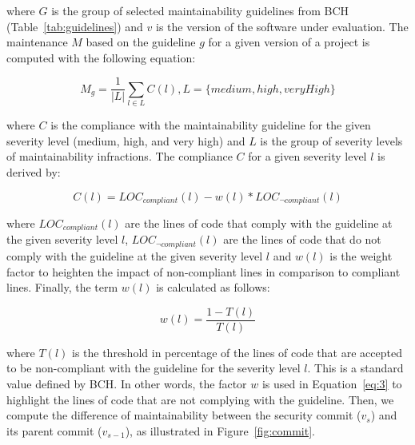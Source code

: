 \documentclass[10pt,conference]{IEEEtran}
\begin{document}
\noindent
where $G$ is the group of selected maintainability guidelines from BCH
(Table~\ref{tab:guidelines}) and $v$ is the version of the software under
evaluation. The maintenance $M$ based on the guideline $g$ for a given version
of a project is computed with the following equation:

\begin{equation}
    M_{g} = \frac{1}{|L|} \sum_{l \in L}^{} C(l) , L = \{medium, high, veryHigh\}
\end{equation}

\noindent
where $C$ is the compliance with the maintainability guideline for the given
severity level (medium, high, and very high) and $L$ is the group of severity
levels of maintainability infractions. The compliance $C$ for a given severity
level $l$ is derived by:

\begin{equation}\label{eq:3}
    C(l) = LOC_{compliant}(l) - w(l) * LOC_{\neg compliant}(l)
\end{equation}

\noindent
where $LOC_{compliant}(l)$ are the lines of code that comply with the guideline
at the given severity level $l$, $LOC_{\neg compliant}(l)$ are the lines of code
that do not comply with the guideline at the given severity level $l$ and $w(l)$
is the weight factor to heighten the impact of non-compliant lines in comparison to
compliant lines. Finally, the term $w(l)$ is calculated as follows:

\begin{equation}
    w(l) = \frac{1 - T(l)}{T(l)}
\end{equation}

\noindent
where $T(l)$ is the threshold in percentage of the lines of code that are
accepted to be non-compliant with the guideline for the severity level $l$. This
is a standard value defined by BCH. In other words, the factor $w$ is used in
Equation~\ref{eq:3} to highlight the lines of code that are not complying with
the guideline. Then, we compute the difference of maintainability between the
security commit ($v_{s}$) and its parent commit ($v_{s-1}$), as illustrated in
Figure~\ref{fig:commit}.
\end{document}

